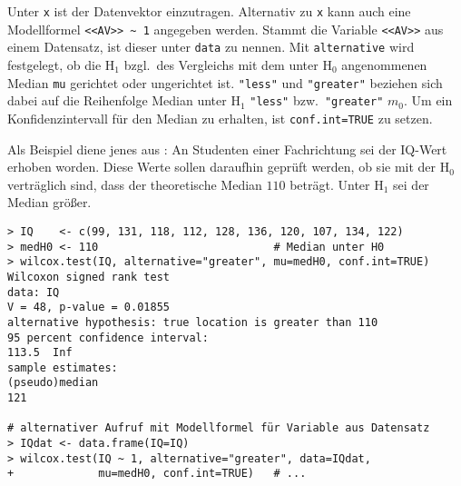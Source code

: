 Unter \lstinline!x! ist der Datenvektor einzutragen. Alternativ zu \lstinline!x! kann auch eine Modellformel \lstinline!<<AV>> ~ 1! angegeben werden. Stammt die Variable \lstinline!<<AV>>! aus einem Datensatz, ist dieser unter \lstinline!data! zu nennen. Mit \lstinline!alternative! wird festgelegt, ob die $\text{H}_{1}$ bzgl.\ des Vergleichs mit dem unter $\text{H}_{0}$ angenommenen Median \lstinline!mu! gerichtet oder ungerichtet ist. \lstinline!"less"! und \lstinline!"greater"! beziehen sich dabei auf die Reihenfolge Median unter $\text{H}_{1}$ \lstinline!"less"! bzw.\ \lstinline!"greater"! $m_{0}$. Um ein Konfidenzintervall für den Median zu erhalten, ist \lstinline!conf.int=TRUE! zu setzen.

Als Beispiel diene jenes aus : An Studenten einer Fachrichtung sei der IQ-Wert erhoben worden. Diese Werte sollen daraufhin geprüft werden, ob sie mit der $\text{H}_{0}$ verträglich sind, dass der theoretische Median $110$ beträgt. Unter $\text{H}_{1}$ sei der Median größer.
\begin{lstlisting}
> IQ    <- c(99, 131, 118, 112, 128, 136, 120, 107, 134, 122)
> medH0 <- 110                           # Median unter H0
> wilcox.test(IQ, alternative="greater", mu=medH0, conf.int=TRUE)
Wilcoxon signed rank test
data: IQ
V = 48, p-value = 0.01855
alternative hypothesis: true location is greater than 110
95 percent confidence interval:
113.5  Inf
sample estimates:
(pseudo)median
121

# alternativer Aufruf mit Modellformel für Variable aus Datensatz
> IQdat <- data.frame(IQ=IQ)
> wilcox.test(IQ ~ 1, alternative="greater", data=IQdat,
+             mu=medH0, conf.int=TRUE)   # ...
\end{lstlisting}


